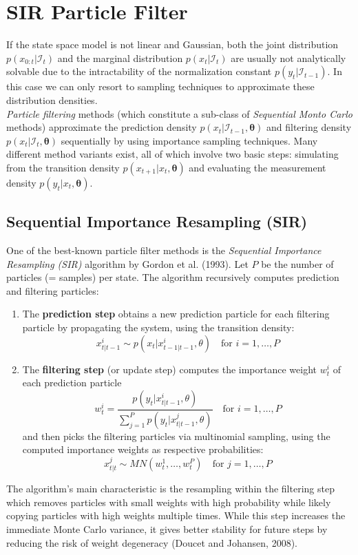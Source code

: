 \documentclass[11pt, oneside]{scrreprt}   	%
\begin{document}
\section{SIR Particle Filter}
If the state space model is not linear and Gaussian, both the joint distribution $p(x_{0:t} | \mathcal{I}_t)$ and the marginal distribution $p(x_{t} | \mathcal{I}_t)$ are usually not analytically solvable due to the intractability of the normalization constant $p(y_t | \mathcal{I}_{t-1})$. In this case we can only resort to sampling techniques to approximate these distribution densities. \\

\textit{Particle filtering} methods (which constitute a sub-class of \textit{Sequential Monto Carlo} methods) approximate the prediction density $p(x_{t} | \mathcal{I}_{t-1}, \boldsymbol{\theta})$ and filtering density $p(x_{t} | \mathcal{I}_{t}, \boldsymbol{\theta})$ sequentially by using importance sampling techniques. Many different method variants exist, all of which involve two basic steps: simulating from the transition density $p(x_{t+1} | x_t, \boldsymbol{\theta})$ and evaluating the measurement density $p(y_t | x_t, \boldsymbol{\theta})$. 

\subsection{Sequential Importance Resampling (SIR)}
One of the best-known particle filter methods is the \textit{Sequential Importance Resampling (SIR)} algorithm by Gordon et al. (1993). Let $P$ be the number of particles (= samples) per state. The algorithm recursively computes prediction and filtering particles:
\begin{enumerate}
	\item The \textbf{prediction step} obtains a new prediction particle for each filtering particle by propagating the system, using the transition density:
	$$
	x_{t | t-1}^i \sim p(x_t | x_{t-1 | t-1}^i, \theta) \quad \text{for } i=1, \ldots, P
	$$
	\item The \textbf{filtering step} (or update step) computes the importance weight $w_t^i$ of each prediction particle 
	$$
	w_{t}^i = \frac{p(y_t | x_{t | t-1}^i, \theta)}{\sum_{j=1}^P p(y_t | x_{t | t-1}^j, \theta)} \quad \text{for } i=1, \ldots, P
	$$
	and then picks the filtering particles via multinomial sampling, using the computed importance weights as respective probabilities:	
	$$
	x_{t | t }^j \sim MN(w_t^1, \ldots, w_t^P) \quad \text{for } j=1, \ldots, P
	$$
\end{enumerate}
The algorithm's main characteristic is the resampling within the filtering step which removes particles with small weights with high probability while likely copying particles with high weights multiple times. While this step increases the immediate Monte Carlo variance, it gives better stability for future steps by reducing the risk of weight degeneracy (Doucet and Johansen, 2008). 
\end{document}
